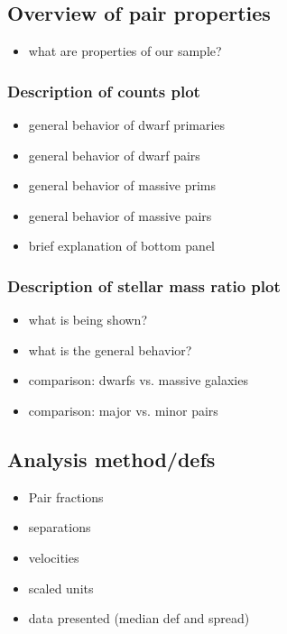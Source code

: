 \documentclass[twocolumn]{aastex631}
\begin{document}
\subsection{Overview of pair properties} \label{sec:methods-props}
    \begin{itemize}
        \item what are properties of our sample?
    \end{itemize}
    \subsubsection{Description of counts plot}
            \begin{itemize}
                \item general behavior of dwarf primaries
                \item general behavior of dwarf pairs
                \item general behavior of massive prims
                \item general behavior of massive pairs
                \item brief explanation of bottom panel
            \end{itemize}
    \subsubsection{Description of stellar mass ratio plot}
            \begin{itemize}
                \item what is being shown?
                \item what is the general behavior?
                \item comparison: dwarfs vs. massive galaxies 
                \item comparison: major vs. minor pairs
            \end{itemize}
    
\subsection{Analysis method/defs} \label{sec:methods-analysis}
    \begin{itemize}
        \item Pair fractions
        \item separations
        \item velocities
        \item scaled units
        \item data presented (median def and spread)
    \end{itemize}
\end{document}
